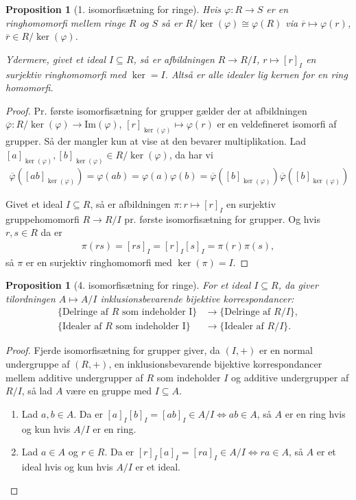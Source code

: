 \documentclass[10pt,twoside,openany,final]{memoir}
\theoremstyle{break}
\newtheorem{proposition}[section]{Proposition}
\theoremstyle{Break}
\begin{document}
\begin{proposition}[1. isomorfisætning for ringe]
Hvis $\varphi \colon R \to S$ er en ringhomomorfi mellem ringe $R$ og $S$ så er $R / \ker(\varphi) \cong \varphi(R)$ via $\overline{r} \mapsto \varphi(r)$, $\overline{r} \in R / \ker(\varphi)$.

\noindent Ydermere, givet et ideal $I \subseteq R$, så er afbildningen $R \to R/I$, $r \mapsto [r]_I$ en surjektiv ringhomomorfi med $\ker=I$. Altså er alle idealer lig kernen for en ring homomorfi.
\end{proposition}
\begin{proof}
Pr. første isomorfisætning for grupper gælder der at afbildningen $\overline{\varphi} \colon R/\ker(\varphi) \to \mathrm{Im}(\varphi)$, $[r]_{\ker(\varphi)} \mapsto \varphi(r)$ er en veldefineret isomorfi af grupper. Så der mangler kun at vise at den bevarer multiplikation. Lad $[a]_{\ker(\varphi)}, [b]_{\ker(\varphi)} \in R/\ker(\varphi)$, da har vi
\begin{align*}
\overline{\varphi}([ab]_{\ker(\varphi)})=\varphi(ab)=\varphi(a)\varphi(b)=\overline{\varphi}([b]_{\ker(\varphi)})\overline{\varphi}([b]_{\ker(\varphi)})
\end{align*}

Givet et ideal $I \subseteq R$, så er afbildningen $\pi \colon r \mapsto [r]_I$ en surjektiv gruppehomomorfi $R \to R/I$  pr. første isomorfisætning for grupper. Og hvis $r,s \in R$ da er
\begin{align*}
\pi(rs)=[rs]_I=[r]_I[s]_I=\pi(r)\pi(s),
\end{align*}
så $\pi$ er en surjektiv ringhomomorfi med $\ker(\pi)=I$.
\end{proof}

\begin{proposition}[4. isomorfisætning for ringe]
For et ideal $I \subseteq R$, da giver tilordningen $A \mapsto A/I$ inklusionsbevarende bijektive korrespondancer:
\begin{align*}
\{\text{Delringe af } R \text{ som indeholder I} \} &\to \{\text{Delringe af } R/I\},\\
\{\text{Idealer af } R \text{ som indeholder I} \} & \to \{\text{Idealer af } R/I\}.
\end{align*}
\end{proposition}
\begin{proof}
Fjerde isomorfisætning for grupper giver, da $(I,+)$ er en normal undergruppe af $(R,+)$, en inklusionsbevarende bijektive korrespondancer mellem additive undergrupper af $R$ som indeholder $I$ og additive undergrupper af $R/I$, så lad $A$ være en gruppe med $I \subseteq A$.
\begin{enumerate}
\item Lad $a,b \in A$. Da er $[a]_I[b]_I=[ab]_I \in A/I \iff ab \in A$, så $A$ er en ring hvis og kun hvis $A/I$ er en ring.
\item Lad $a \in A$ og $r \in R$. Da er $[r]_I[a]_I=[ra]_I \in A/I \iff ra \in A$, så $A$ er et ideal hvis og kun hvis $A/I$ er et ideal.
\end{enumerate}
\end{proof}
\end{document}
